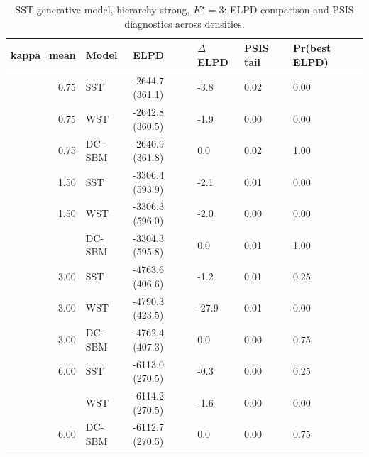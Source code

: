 \begin{table}
\centering
\caption{SST generative model, hierarchy strong, $K^\star=3$: ELPD comparison and PSIS diagnostics across densities.}
\centering
\begin{tabular}[t]{rlllll}
\toprule
kappa_mean & Model & ELPD & $\Delta$ELPD & PSIS tail & Pr(best ELPD)\\
\midrule
0.75 & SST & -2644.7 (361.1) & -3.8 & 0.02 & 0.00\\
0.75 & WST & -2642.8 (360.5) & -1.9 & 0.00 & 0.00\\
0.75 & DC-SBM & -2640.9 (361.8) & 0.0 & 0.02 & 1.00\\
1.50 & SST & -3306.4 (593.9) & -2.1 & 0.01 & 0.00\\
1.50 & WST & -3306.3 (596.0) & -2.0 & 0.00 & 0.00\\
\addlinespace
1.50 & DC-SBM & -3304.3 (595.8) & 0.0 & 0.01 & 1.00\\
3.00 & SST & -4763.6 (406.6) & -1.2 & 0.01 & 0.25\\
3.00 & WST & -4790.3 (423.5) & -27.9 & 0.01 & 0.00\\
3.00 & DC-SBM & -4762.4 (407.3) & 0.0 & 0.00 & 0.75\\
6.00 & SST & -6113.0 (270.5) & -0.3 & 0.00 & 0.25\\
\addlinespace
6.00 & WST & -6114.2 (270.5) & -1.6 & 0.00 & 0.00\\
6.00 & DC-SBM & -6112.7 (270.5) & 0.0 & 0.00 & 0.75\\
\bottomrule
\end{tabular}
\end{table}
